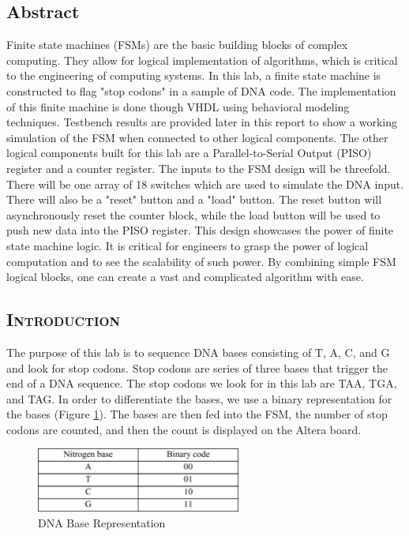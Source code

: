 \documentclass[11pt]{report}
\begin{document}
\begin{spacing}{1.5}
  \chapter*{Abstract}
  \label{cha:abstract}
\vspace{72pt}

Finite state machines (FSMs) are the basic building blocks of complex computing.  They allow for logical implementation of algorithms, which is critical to the engineering of computing systems.  In this lab, a finite state machine is constructed to flag "stop codons" in a sample of DNA code.  The implementation of this finite machine is done though VHDL using behavioral modeling techniques.  Testbench results are provided later in this report to show a working simulation of the FSM when connected to other logical components.  The other logical components built for this lab are a Parallel-to-Serial Output (PISO) register and a counter register.  The inputs to the FSM design will be threefold.  There will be one array of 18 switches which are used to simulate the DNA input.  There will also be a "reset" button and a "load" button.  The reset button will asynchronously reset the counter block, while the load button will be used to push new data into the PISO register. This design showcases the power of finite state machine logic.  It is critical for engineers to grasp the power of logical computation and to see the scalability of such power.  By combining simple FSM logical blocks, one can create a vast and complicated algorithm with ease.

\clearpage

\section*{\scshape Introduction} %
\label{cha:introduction}

The purpose of this lab is to sequence DNA bases consisting of T, A, C, and G and look for stop codons.  Stop codons are series of three bases that trigger the end of a DNA sequence.  The stop codons we look for in this lab are TAA, TGA, and TAG.  In order to differentiate the bases, we use a binary representation for the bases (Figure \ref{fig:bases}).  The bases are then fed into the FSM, the number of stop codons are counted, and then the count is displayed on the Altera board.

\vspace{15px}
\begin{figure}[H]
    \centering
    \includegraphics[width=0.6\textwidth,keepaspectratio]{bases}
    \caption{DNA Base Representation}
    \label{fig:bases}
\end{figure}


\end{spacing}
\end{document}
